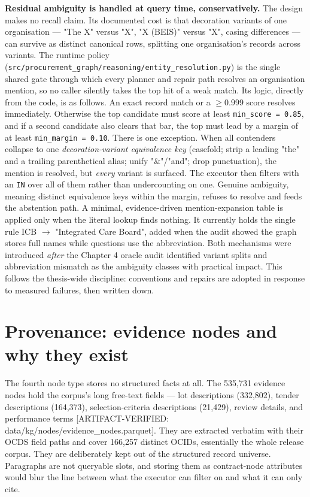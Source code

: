 \textbf{Residual ambiguity is handled at query time, conservatively.} The design makes no recall claim. Its documented cost is that decoration variants of one organisation --- "The X" versus "X", "X (BEIS)" versus "X", casing differences --- can survive as distinct canonical rows, splitting one organisation's records across variants. The runtime policy (\texttt{src/procurement\_graph/reasoning/entity\_resolution.py}) is the single shared gate through which every planner and repair path resolves an organisation mention, so no caller silently takes the top hit of a weak match. Its logic, directly from the code, is as follows. An exact record match or a $\geq$0.999 score resolves immediately. Otherwise the top candidate must score at least \texttt{min\_score = 0.85}, and if a second candidate also clears that bar, the top must lead by a margin of at least \texttt{min\_margin = 0.10}. There is one exception. When all contenders collapse to one \emph{decoration-variant equivalence key} (casefold; strip a leading "the" and a trailing parenthetical alias; unify "\&"/"and"; drop punctuation), the mention is resolved, but \emph{every} variant is surfaced. The executor then filters with an \texttt{IN} over all of them rather than undercounting on one. Genuine ambiguity, meaning distinct equivalence keys within the margin, refuses to resolve and feeds the abstention path. A minimal, evidence-driven mention-expansion table is applied only when the literal lookup finds nothing. It currently holds the single rule ICB $\rightarrow$ "Integrated Care Board", added when the audit showed the graph stores full names while questions use the abbreviation. Both mechanisms were introduced \emph{after} the Chapter 4 oracle audit identified variant splits and abbreviation mismatch as the ambiguity classes with practical impact. This follows the thesis-wide discipline: conventions and repairs are adopted in response to measured failures, then written down.

\section{Provenance: evidence nodes and why they exist}\label{sec:provenance-evidence-nodes-and-why-they-e}

The fourth node type stores no structured facts at all. The 535,731 evidence nodes hold the corpus's long free-text fields --- lot descriptions (332,802), tender descriptions (164,373), selection-criteria descriptions (21,429), review details, and performance terms [ARTIFACT-VERIFIED: data/kg/nodes/evidence\_nodes.parquet]. They are extracted verbatim with their OCDS field paths and cover 166,257 distinct OCIDs, essentially the whole release corpus. They are deliberately kept out of the structured record universe. Paragraphs are not queryable slots, and storing them as contract-node attributes would blur the line between what the executor can filter on and what it can only cite.

